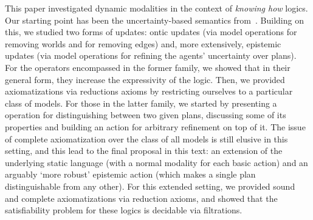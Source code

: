 This paper investigated dynamic modalities in the context of \emph{knowing how} logics. Our starting point has been the uncertainty-based semantics from~\cite{AFSVQ21,AFSVQ23report}. 
Building on this, we studied two forms of updates: ontic updates (via model operations for removing worlds and for removing edges) and, more extensively, epistemic updates (via model operations for refining the agents' uncertainty over plans). For the operators encompassed in the former family, we showed that in their general form, they increase the expressivity of the logic. Then, we provided axiomatizations via reductions axioms by restricting ourselves to a particular class of models. For those in the latter family, we started by presenting a operation for distinguishing between two given plans, discussing some of its properties and building an action for arbitrary refinement on top of it. The issue of complete axiomatization over the class of all models is still elusive in this setting, and this lead to the final proposal in this text: an extension of the underlying static language (with a normal modality for each basic action) and an arguably `more robust' epistemic action (which makes a single plan distinguishable from any other). For this extended setting, we provided sound and complete axiomatizations via reduction axioms, and showed that the satisfiability problem for these logics is decidable via filtrations. 


\begin{comment}
To the best of our knowledge, this is the first attempt to establish a theory of dynamic epistemic logics for knowing how. We argue that the semantics provided in~\cite{AFSVQ21,AFSVQ23report} is the crucial aspect for succeeding in this goal. Moreover, our work opens the path to study other dynamic operators in this context. For instance, we could define dynamic modalities based on action models, like those in~\cite{BaltagMS98,DELbook,GalimullinA22}. 
Also, it would be interesting to explore alternative techniques for obtaining proof systems without a general rule of substitution, for instance, by building a dynamic logic over a hybrid logic semantics (see e.g.~\cite{BenthemMZ2022}). Finally, we would like to characterize the exact complexity of the dynamic logics we introduced.
\end{comment}


